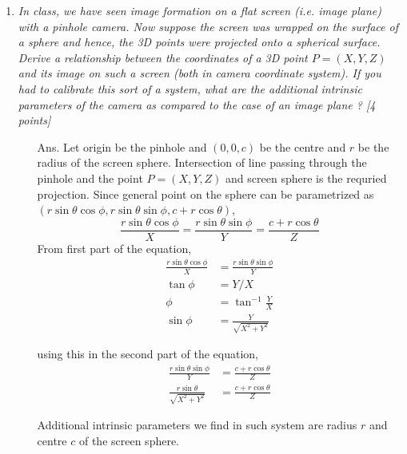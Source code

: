 \documentclass[11pt]{article}
\begin{document}
\maketitle

\begin{enumerate}
\item \textit{In class, we have seen image formation on a flat screen (i.e. image plane) with a pinhole camera. Now suppose the screen was wrapped on the surface of a sphere and hence, the 3D points were projected onto a spherical surface. Derive a relationship between the coordinates of a 3D point $P = (X,Y,Z)$ and its image on such a screen (both in camera coordinate system). If you had to calibrate this sort of a system, what are the additional intrinsic parameters of the camera as compared to the case of an image plane ? \textsf{[4 points]}}
\begin{itemize}
	\item[Ans.] Let origin be the pinhole and $(0,0,c)$ be the centre and $r$ be the radius of the screen sphere. Intersection of line passing through the pinhole and the point $P = (X,Y,Z)$ and screen sphere is the requried projection.
	Since general point on the sphere can be parametrized as $(r\sin{\theta}\cos{\phi}, r\sin{\theta}\sin{\phi}, c+r\cos{\theta})$,
	\[	\frac{r\sin{\theta}\cos{\phi}}{X} = \frac{r\sin{\theta}\sin{\phi}}{Y} = \frac{c+r\cos{\theta}}{Z}
	\]
	From first part of the equation,
	\begin{align*}
		\frac{r\sin{\theta}\cos{\phi}}{X} &= \frac{r\sin{\theta}\sin{\phi}}{Y}\\
		\tan{\phi} &= Y/X  \\
		\phi &= \tan ^{-1}{\frac{Y}{X}} \\
		\sin{\phi} &= \frac{Y}{\sqrt{X^2+Y^2}}
	\end{align*}

	using this in the second part of the equation,
	\begin{align*}
		\frac{r\sin{\theta}\sin{\phi}}{Y} &= \frac{c+r\cos{\theta}}{Z}\\
		\frac{r\sin{\theta}}{\sqrt{X^2+Y^2}} &= \frac{c+r\cos{\theta}}{Z}
	\end{align*}

	Additional intrinsic parameters we find in such system are radius $r$ and centre $c$ of the screen sphere. 
\end{itemize}



\end{enumerate}
\end{document}

